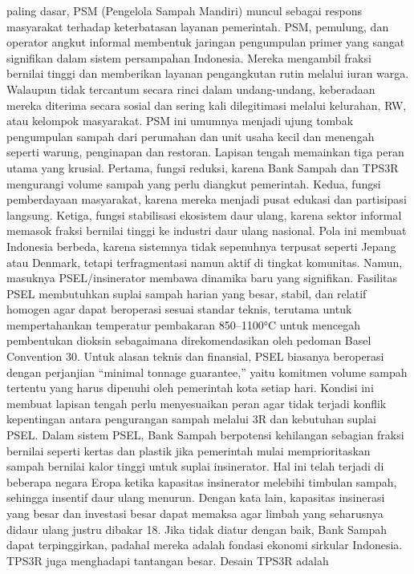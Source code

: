 \documentclass[
  letterpaper,
  DIV=11,
  numbers=noendperiod]{scrreprt}
\begin{document}
paling dasar, PSM (Pengelola Sampah Mandiri) muncul sebagai respons
masyarakat terhadap keterbatasan layanan pemerintah. PSM, pemulung, dan
operator angkut informal membentuk jaringan pengumpulan primer yang
sangat signifikan dalam sistem persampahan Indonesia. Mereka mengambil
fraksi bernilai tinggi dan memberikan layanan pengangkutan rutin melalui
iuran warga. Walaupun tidak tercantum secara rinci dalam undang-undang,
keberadaan mereka diterima secara sosial dan sering kali dilegitimasi
melalui kelurahan, RW, atau kelompok masyarakat. PSM ini umumnya menjadi
ujung tombak pengumpulan sampah dari perumahan dan unit usaha kecil dan
menengah seperti warung, penginapan dan restoran. Lapisan tengah
memainkan tiga peran utama yang krusial. Pertama, fungsi reduksi, karena
Bank Sampah dan TPS3R mengurangi volume sampah yang perlu diangkut
pemerintah. Kedua, fungsi pemberdayaan masyarakat, karena mereka menjadi
pusat edukasi dan partisipasi langsung. Ketiga, fungsi stabilisasi
ekosistem daur ulang, karena sektor informal memasok fraksi bernilai
tinggi ke industri daur ulang nasional. Pola ini membuat Indonesia
berbeda, karena sistemnya tidak sepenuhnya terpusat seperti Jepang atau
Denmark, tetapi terfragmentasi namun aktif di tingkat komunitas. Namun,
masuknya PSEL/insinerator membawa dinamika baru yang signifikan.
Fasilitas PSEL membutuhkan suplai sampah harian yang besar, stabil, dan
relatif homogen agar dapat beroperasi sesuai standar teknis, terutama
untuk mempertahankan temperatur pembakaran 850--1100°C untuk mencegah
pembentukan dioksin sebagaimana direkomendasikan oleh pedoman Basel
Convention 30. Untuk alasan teknis dan finansial, PSEL biasanya
beroperasi dengan perjanjian ``minimal tonnage guarantee,'' yaitu
komitmen volume sampah tertentu yang harus dipenuhi oleh pemerintah kota
setiap hari. Kondisi ini membuat lapisan tengah perlu menyesuaikan peran
agar tidak terjadi konflik kepentingan antara pengurangan sampah melalui
3R dan kebutuhan suplai PSEL. Dalam sistem PSEL, Bank Sampah berpotensi
kehilangan sebagian fraksi bernilai seperti kertas dan plastik jika
pemerintah mulai memprioritaskan sampah bernilai kalor tinggi untuk
suplai insinerator. Hal ini telah terjadi di beberapa negara Eropa
ketika kapasitas insinerator melebihi timbulan sampah, sehingga insentif
daur ulang menurun. Dengan kata lain, kapasitas insinerasi yang besar
dan investasi besar dapat memaksa agar limbah yang seharusnya didaur
ulang justru dibakar 18. Jika tidak diatur dengan baik, Bank Sampah
dapat terpinggirkan, padahal mereka adalah fondasi ekonomi sirkular
Indonesia. TPS3R juga menghadapi tantangan besar. Desain TPS3R adalah
\end{document}
